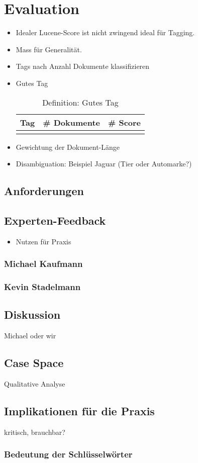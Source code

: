 \chapter{Evaluation}




\begin{itemize}
    \item Idealer Lucene-Score ist nicht zwingend ideal für Tagging.
    \item Mass für Generalität.
    \item Tags nach Anzahl Dokumente klassifizieren
    \item Gutes Tag
    
    \begin{longtable}{|p{4cm}| p{4cm}| p{4cm}|}
  \hline
    \textbf{Tag} & \textbf{\# Dokumente}& \textbf{\# Score}\\\hline
        \caption{Definition: Gutes Tag}
    \label{gutes-tag}
\end{longtable}
    \item Gewichtung der Dokument-Länge
    \item Disambiguation: Beispiel Jaguar (Tier oder Automarke?)
    
\end{itemize}


\section{Anforderungen}

\section{Experten-Feedback}

\begin{itemize}
    \item Nutzen für Praxis
    
\end{itemize}

\subsection{Michael Kaufmann}

\subsection{Kevin Stadelmann}

\section{Diskussion}

Michael oder wir

\section{Case Space}

Qualitative Analyse

\section{Implikationen für die Praxis}

kritisch, brauchbar?

\subsection{Bedeutung der Schlüsselwörter}